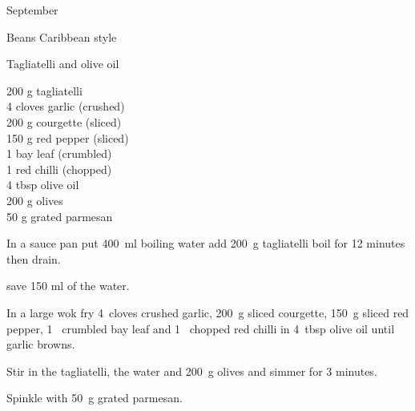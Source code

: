 \begin{menu}{September}
\begin{recipe}{2}{Beans Caribbean style}
\begin{instructions}
    \end{instructions}
    \end{recipe}%
  
    \begin{recipe}{1}{Tagliatelli and olive oil}%
    
		\begin{ingredients}
		200 g tagliatelli  \\
	4 cloves garlic (crushed) \\
	200 g courgette (sliced) \\
	150 g red pepper (sliced) \\
	1  bay leaf (crumbled) \\
	1  red chilli (chopped) \\
	4 tbsp olive oil  \\
	200 g olives  \\
	50 g grated parmesan  \\
	
		\end{ingredients}
	
    \begin{instructions}
    \item 
      In a
      sauce pan
      put
      400~ml  boiling water
      add
      200~g  tagliatelli
      boil for 12 minutes then drain.
    
        save 150 ml of the water.
      \item 
        In a large wok fry
        4~cloves crushed garlic,
        200~g sliced courgette,
        150~g sliced red pepper,
        1~ crumbled bay leaf
        and
        1~ chopped red chilli
        in
        4~tbsp  olive oil
        until garlic browns.
      \item 
        Stir in the tagliatelli,
        the water
        and
        200~g  olives
        and simmer for 3 minutes.
      \item 
        Spinkle with
        50~g  grated parmesan.
      
    \end{instructions}
    \end{recipe}%
  
    \clearpage
    \end{menu}
	
